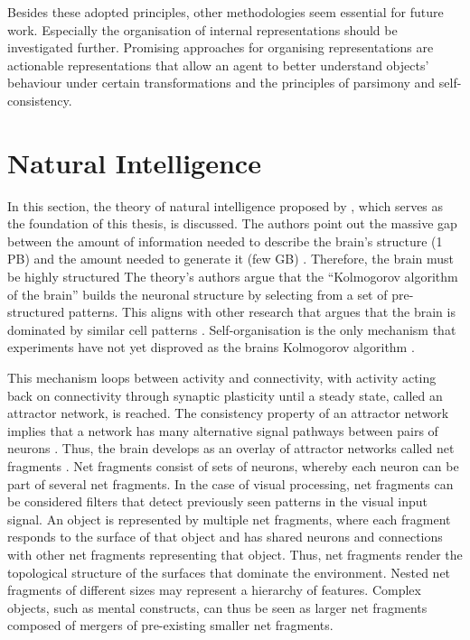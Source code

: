 Besides these adopted principles, other methodologies seem essential for future work. Especially the organisation of internal representations should be investigated further. Promising approaches for organising representations are actionable representations that allow an agent to better understand objects' behaviour under certain transformations and the principles of parsimony and self-consistency.

\section{Natural Intelligence}
In this section, the theory of natural intelligence proposed by , which serves as the foundation of this thesis, is discussed.
The authors point out the massive gap between the amount of information needed to describe the brain's structure (1 PB) and the amount needed to generate it (few GB) . Therefore, the brain must be highly structured 
The theory's authors argue that the ``Kolmogorov algorithm  of the brain'' builds the neuronal structure by selecting from a set of pre-structured patterns. This aligns with other research that argues that the brain is dominated by similar cell patterns .
Self-organisation is the only mechanism that experiments have not yet disproved as the brains Kolmogorov algorithm .

This mechanism loops between activity and connectivity, with activity acting back on connectivity through synaptic plasticity until a steady state, called an attractor network, is reached.
The consistency property of an attractor network implies that a network has many alternative signal pathways between pairs of neurons \cite{von_der_malsburg_neural_1987}.
Thus, the brain develops as an overlay of attractor networks called net fragments \cite{von_der_malsburg_concerning_2018}.
Net fragments consist of sets of neurons, whereby each neuron can be part of several net fragments.
In the case of visual processing, net fragments can be considered filters that detect previously seen patterns in the visual input signal.
An object is represented by multiple net fragments, where each fragment responds to the surface of that object and has shared neurons and connections with other net fragments representing that object.
Thus, net fragments render the topological structure of the surfaces that dominate the environment.
Nested net fragments of different sizes may represent a hierarchy of features.
Complex objects, such as mental constructs, can thus be seen as larger net fragments composed of mergers of pre-existing smaller net fragments.

